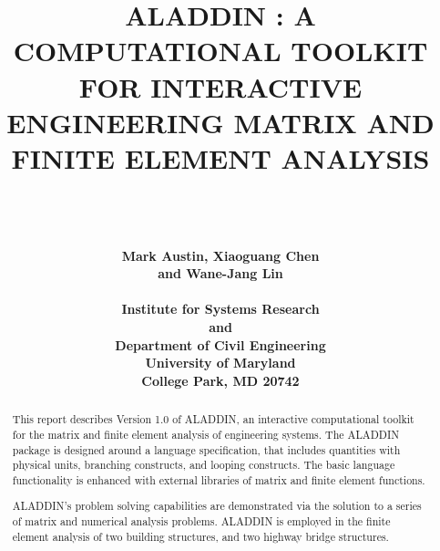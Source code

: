




\textheight 9.0in
\textwidth 6.30in
\voffset -0.85in
\hoffset -0.60in
\def\R{{\bf R}}
\def\j{{\rm j}}
\def\C{{\bf C}}




\title{\bf ALADDIN : A COMPUTATIONAL TOOLKIT FOR INTERACTIVE ENGINEERING MATRIX AND FINITE ELEMENT ANALYSIS}

\begin{figure}
\centerline{}
\end{figure}

\author{                                 \\
                                         \\
                                         \\
        \bf Mark Austin, Xiaoguang Chen  \\
        \bf and Wane-Jang Lin            \\
                                         \\
         Institute for Systems Research\\
         and \\
         Department of Civil Engineering\\
         University of Maryland \\
         College Park, MD 20742}

\maketitle

\begin{abstract}

\vspace{0.15 in}
\noindent\hspace{0.5 in}
This report describes Version 1.0 of ALADDIN,
an interactive computational toolkit for the matrix
and finite element analysis of engineering systems.
The ALADDIN package is designed around a language specification,
that includes quantities with physical units,
branching constructs, and looping constructs.
The basic language functionality is enhanced with 
external libraries of matrix and finite element functions.

\vspace{0.15 in}
\noindent\hspace{0.5 in}
ALADDIN's problem solving capabilities are demonstrated via the
solution to a series of matrix and numerical analysis problems.
ALADDIN is employed in the finite element analysis of two building structures,
and two highway bridge structures. 
\end{abstract}

